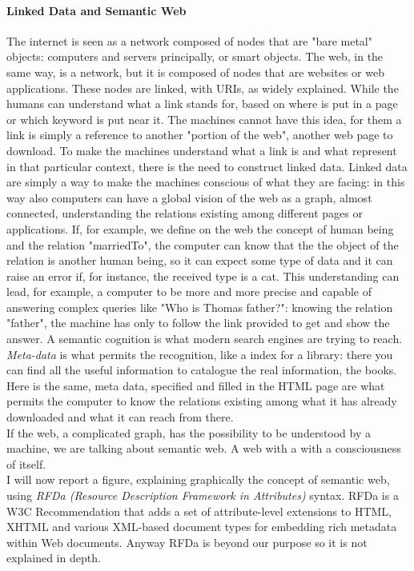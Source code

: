 \paragraph{Linked Data and Semantic Web} The internet is seen as a network composed of nodes that are "bare metal" objects: computers and servers principally, or smart objects. The web, in the same way, is a network, but it is composed of nodes that are websites or web applications. These nodes are linked, with URIs, as widely explained. While the humans can understand what a link stands for, based on where is put in a page or which keyword is put near it. The machines cannot have this idea, for them a link is simply a reference to another "portion of the web", another web page to download. To make the machines understand what a link is and what represent in that particular context, there is the need to construct linked data. Linked data are simply a way to make the machines conscious of what they are facing: in this way also computers can have a global vision of the web as a graph, almost connected, understanding the relations existing among different pages or applications. If, for example, we define on the web the concept of human being and the relation "marriedTo", the computer can know that the the object of the relation is another human being, so it can expect some type of data and it can raise an error if, for instance, the received type is a cat. This understanding can lead, for example, a computer to be more and more precise and capable of answering complex queries like "Who is Thomas father?": knowing the relation "father", the machine has only to follow the link provided to get and show the answer. A semantic cognition is what modern search engines are trying to reach.\\ 
\textit{Meta-data} is what permits the recognition, like a index for a library: there you can find all the useful information to catalogue the real information, the books. Here is the same, meta data, specified and filled in the HTML page are what permits the computer to know the relations existing among what it has already downloaded and what it can reach from there. \\
If the web, a complicated graph, has the possibility to be understood by a machine, we are talking about semantic web. A web with a with a consciousness of itself. \cite{bizer2009linked} \\
I will now report a figure, explaining graphically the concept of semantic web, using \textit{RFDa (Resource Description Framework in Attributes)} syntax. RFDa is a W3C Recommendation that adds a set of attribute-level extensions to HTML, XHTML and various XML-based document types for embedding rich metadata within Web documents. Anyway RFDa is beyond our purpose so it is not explained in depth.  

